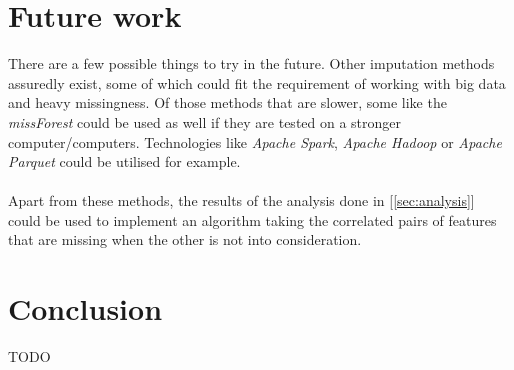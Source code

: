 \documentclass[11pt]{article}
\begin{document}
  \section{Future work}
    There are a few possible things to try in the future. Other imputation methods assuredly exist, some of which could fit the requirement of working with big data and heavy missingness. Of those methods that are slower, some like the {\it missForest}\cite{otfi} could be used as well if they are tested on a stronger computer/computers. Technologies like {\it Apache Spark}, {\it Apache Hadoop} or {\it Apache Parquet} could be utilised for example. \cite{spark}\cite{hadoop}\cite{parquet}
    \\~\\
    Apart from these methods, the results of the analysis done in [\ref{sec:analysis}] could be used to implement an algorithm taking the correlated pairs of features that are missing when the other is not into consideration.
  \section*{Conclusion}
    {\color{red}TODO}
  \newpage
  
\end{document}
